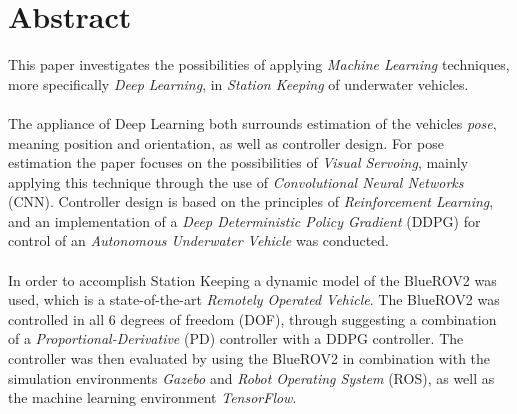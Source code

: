 \section*{Abstract}
This paper investigates the possibilities of applying \textit{Machine Learning} techniques, more specifically \textit{Deep Learning}, in \textit{Station Keeping} of underwater vehicles.\\\\The appliance of Deep Learning both surrounds estimation of the vehicles \textit{pose}, meaning position and orientation, as well as controller design. For pose estimation the paper focuses on the possibilities of \textit{Visual Servoing}, mainly applying this technique through the use of \textit{Convolutional Neural Networks} (CNN). Controller design is based on the principles of \textit{Reinforcement Learning}, and an implementation of a \textit{Deep Deterministic Policy Gradient} (DDPG) for control of an \textit{Autonomous Underwater Vehicle} was conducted.\\\\
In order to accomplish Station Keeping a dynamic model of the BlueROV2 was used, which is a state-of-the-art \textit{Remotely Operated Vehicle}. The BlueROV2 was controlled in all 6 degrees of freedom (DOF), through suggesting a combination of a \textit{Proportional-Derivative} (PD) controller with a DDPG controller. The controller was then evaluated by using the BlueROV2 in combination with the simulation environments \textit{Gazebo} and \textit{Robot Operating System} (ROS), as well as the machine learning environment \textit{TensorFlow}. 